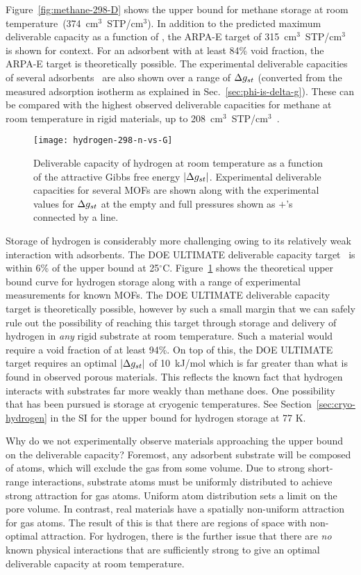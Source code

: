 Figure~\ref{fig:methane-298-D} shows the upper bound for methane storage at
room temperature~(374~cm$^3$~STP/cm$^3$). In addition to the predicted maximum
deliverable capacity as a function of \gst, the ARPA-E target of
315~cm$^3$~STP/cm$^3$~\cite{arpaemove} is shown for context. For an adsorbent
with at least 84\% void fraction, the ARPA-E target is theoretically possible.
The experimental deliverable capacities of several
adsorbents~\cite{mason2014evaluating} are also shown over a range of $\Delta g_{st}$
(converted from the measured adsorption isotherm as explained in
Sec.~\ref{sec:phi-is-delta-g}). These can be compared with the highest observed
deliverable capacities for methane at room temperature in rigid materials, up
to 208~cm$^3$~STP/cm$^3$~\cite{simon2015materials}.

\begin{figure}
    \centering
    \texttt{[image: hydrogen-298-n-vs-G]}
    \caption{Deliverable capacity of hydrogen at room temperature as a function of the attractive Gibbs free energy $|\Delta g_{st}|$.  Experimental deliverable capacities for several MOFs are shown along with the experimental values for $\Delta g_{st}$ at the empty and full pressures shown as $+$'s connected by a line.}
    \label{fig:hydrogen-298-D}
\end{figure}

Storage of hydrogen is considerably more challenging owing to its relatively
weak interaction with adsorbents. The DOE ULTIMATE deliverable capacity
target~\cite{DOE} is within 6\% of the upper bound at 25$^\circ$C.
Figure~\ref{fig:hydrogen-298-D} shows the theoretical upper bound curve for
hydrogen storage along with a range of experimental measurements for known
MOFs. The DOE ULTIMATE deliverable capacity target is theoretically possible,
however by such a small margin that we can safely rule out the possibility of
reaching this target through storage and delivery of hydrogen in \emph{any}
rigid substrate at room temperature. Such a material would require a void
fraction of at least 94\%. On top of this, the DOE ULTIMATE target requires an
optimal $|\Delta g_{st}|$ of 10~kJ/mol which is far greater than what is found in
observed porous materials. This reflects the known fact that hydrogen interacts
with substrates far more weakly than methane does. One possibility that has
been pursued is storage at cryogenic temperatures. See
Section~\ref{sec:cryo-hydrogen} in the SI for the upper bound for hydrogen
storage at 77 K.

Why do we not experimentally observe materials approaching the upper bound on
the deliverable capacity? Foremost, any adsorbent substrate will be composed of
atoms, which will exclude the gas from some volume. Due to strong short-range
interactions, substrate atoms must be uniformly distributed to achieve strong
attraction for gas atoms. Uniform atom distribution sets a limit on the pore
volume. In contrast, real materials have a spatially non-uniform attraction for
gas atoms. The result of this is that there are regions of space with
non-optimal attraction. For hydrogen, there is the further issue that there are
\emph{no} known physical interactions that are sufficiently strong to give an
optimal deliverable capacity at room temperature.

